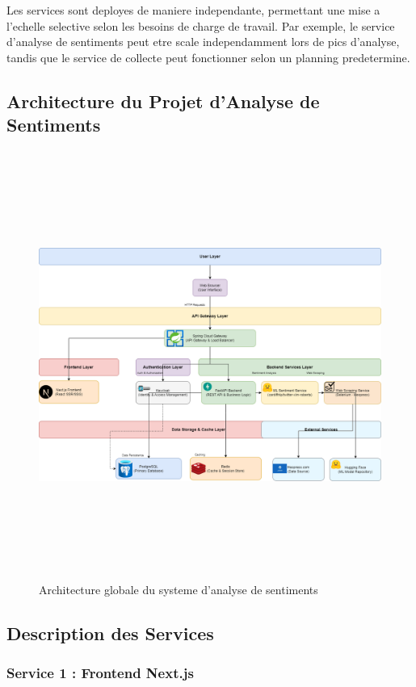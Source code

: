 Les services sont deployes de maniere independante, permettant une mise a l'echelle selective selon les besoins de charge de travail. Par exemple, le service d'analyse de sentiments peut etre scale independamment lors de pics d'analyse, tandis que le service de collecte peut fonctionner selon un planning predetermine.

\subsection{Architecture du Projet d'Analyse de Sentiments}

\begin{figure}[H]
\centering
\includegraphics[height=14cm , width=\textwidth]{assets/images/arch.png}
\caption{Architecture globale du systeme d'analyse de sentiments}
\label{fig:architecture}
\end{figure}

\subsection{Description des Services}

\subsubsection{Service 1 : Frontend Next.js}


